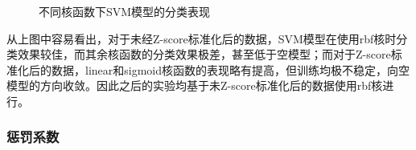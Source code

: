 \documentclass[12pt,a4paper]{article}
\theoremstyle{definition}
\begin{document}
\begin{figure}[H]
	\centering
	\caption{不同核函数下SVM模型的分类表现}
	\label{fig:svm-kernel1}
\end{figure}

\vspace{0.01\linewidth}
从上图中容易看出，对于未经Z-score标准化后的数据，SVM模型在使用rbf核时分类效果较佳，而其余核函数的分类效果极差，甚至低于空模型；而对于Z-score标准化后的数据，linear和sigmoid核函数的表现略有提高，但训练均极不稳定，向空模型的方向收敛。因此之后的实验均基于未Z-score标准化后的数据使用rbf核进行。

\subsubsection{惩罚系数}
\label{sec:penalty}
\end{document}
